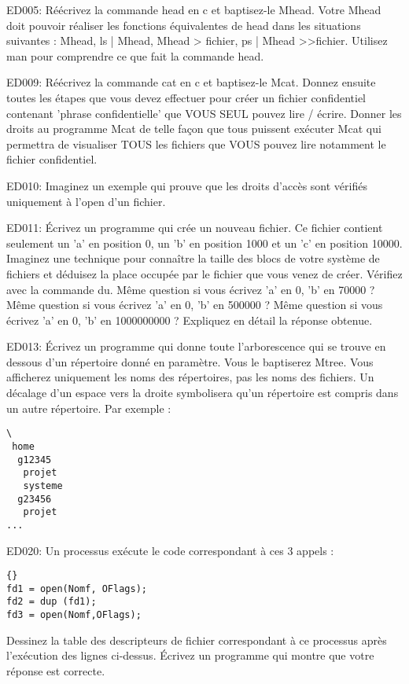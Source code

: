 
\begin{list}{+}{}

\item ED005: 
Réécrivez la commande head en c et baptisez-le Mhead. Votre Mhead doit pouvoir réaliser les fonctions équivalentes de head dans les situations suivantes : Mhead, ls | Mhead, Mhead > fichier, ps | Mhead >>fichier. Utilisez man pour comprendre ce que fait la commande head.

\item ED009: 
Réécrivez la commande cat en c et baptisez-le Mcat.
Donnez ensuite toutes les étapes que vous devez effectuer pour créer un fichier confidentiel contenant 'phrase confidentielle' que VOUS SEUL pouvez lire / écrire.
Donner les droits au programme Mcat de telle façon que tous puissent exécuter Mcat qui permettra de visualiser TOUS les fichiers que VOUS pouvez lire notamment le fichier confidentiel.

\item ED010: 
Imaginez un exemple qui prouve que les droits d'accès sont vérifiés uniquement à l'open d'un fichier.

\item ED011: 
Écrivez un programme qui crée un nouveau fichier. Ce fichier contient seulement un 'a' en position 0, un 'b' en position 1000 et un 'c' en position 10000. Imaginez une technique pour connaître la taille des blocs de votre système de fichiers et déduisez la place occupée par le fichier que vous venez de créer. Vérifiez avec la commande du. Même question si vous écrivez 'a' en 0, 'b' en 70000 ? Même question si vous écrivez 'a' en 0, 'b' en 500000 ? Même question si vous écrivez 'a' en 0, 'b' en 1000000000 ? Expliquez en détail la réponse obtenue.

\item ED013: 
Écrivez un programme qui donne toute l'arborescence qui se trouve en dessous d'un répertoire donné en paramètre. Vous le baptiserez Mtree. Vous afficherez uniquement les noms des répertoires, pas les noms des fichiers. Un décalage d'un espace vers la droite symbolisera qu'un répertoire est compris dans un autre répertoire. Par exemple :
\begin{verbatim}
\
 home
  g12345
   projet
   systeme
  g23456
   projet
...
\end{verbatim}


\item ED020: 
Un processus exécute le code correspondant à ces 3 appels :
\begin{lstlisting}[frame=trBL]{}
fd1 = open(Nomf, OFlags);
fd2 = dup (fd1);
fd3 = open(Nomf,OFlags);
\end{lstlisting}
Dessinez la table des descripteurs de fichier correspondant à ce processus après l'exécution des lignes ci-dessus. Écrivez un programme qui montre que votre réponse est correcte.



\end{list}
